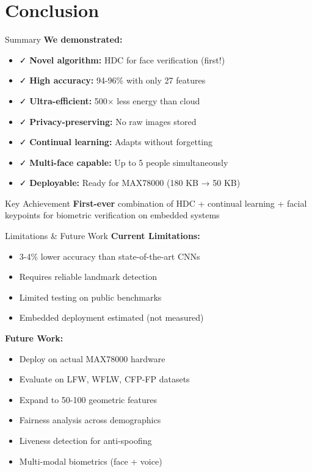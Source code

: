 \documentclass[aspectratio=169]{beamer}
\begin{document}
\section{Conclusion}

\begin{frame}{Summary}
\textbf{We demonstrated:}

\begin{itemize}
    \item ✓ \textbf{Novel algorithm:} HDC for face verification (first!)
    \item ✓ \textbf{High accuracy:} 94-96\% with only 27 features
    \item ✓ \textbf{Ultra-efficient:} 500× less energy than cloud
    \item ✓ \textbf{Privacy-preserving:} No raw images stored
    \item ✓ \textbf{Continual learning:} Adapts without forgetting
    \item ✓ \textbf{Multi-face capable:} Up to 5 people simultaneously
    \item ✓ \textbf{Deployable:} Ready for MAX78000 (180 KB → 50 KB)
\end{itemize}

\begin{alertblock}{Key Achievement}
\textbf{First-ever} combination of HDC + continual learning + facial keypoints for biometric verification on embedded systems
\end{alertblock}
\end{frame}

\begin{frame}{Limitations \& Future Work}
\textbf{Current Limitations:}
\begin{itemize}
    \item 3-4\% lower accuracy than state-of-the-art CNNs
    \item Requires reliable landmark detection
    \item Limited testing on public benchmarks
    \item Embedded deployment estimated (not measured)
\end{itemize}

\vspace{1em}

\textbf{Future Work:}
\begin{itemize}
    \item Deploy on actual MAX78000 hardware
    \item Evaluate on LFW, WFLW, CFP-FP datasets
    \item Expand to 50-100 geometric features
    \item Fairness analysis across demographics
    \item Liveness detection for anti-spoofing
    \item Multi-modal biometrics (face + voice)
\end{itemize}
\end{frame}
\end{document}
